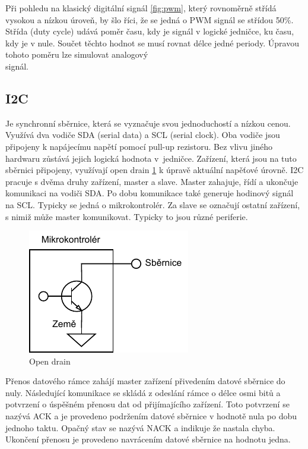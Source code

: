 \newpage
Při pohledu na klasický digitální signál \ref{fig:pwm}, který rovnoměrně střídá vysokou a nízkou úroveň, by šlo říci, že se jedná o PWM signál se střídou 50\%. Střída (duty cycle) udává poměr času, kdy je signál v logické jedničce, ku času, kdy je v nule. Součet těchto hodnot se musí rovnat délce jedné periody. Úpravou tohoto poměru lze simulovat analogový \\ signál.~\cite[str:~116-118]{embeded_robotics}

\subsection*{I2C}
Je synchronní sběrnice, která se vyznačuje svou jednoduchostí a nízkou cenou. Využívá dva vodiče SDA (serial data) a SCL (serial clock). Oba vodiče jsou připojeny k napájecímu napětí pomocí pull-up rezistoru. Bez vlivu jiného hardwaru zůstává jejich logická hodnota v~jedničce. Zařízení, která jsou na tuto sběrnici připojeny, využívají open drain \ref{fig:open_drain} k úpravě aktuální napěťové úrovně. I2C pracuje s dvěma druhy zařízení, master a slave. Master zahajuje, řídí a ukončuje komunikaci na vodiči SDA. Po dobu komunikace také generuje hodinový signál na SCL. Typicky se jedná o mikrokontrolér. Za slave se označují ostatní zařízení, s nimiž může master komunikovat. Typicky to jsou různé periferie. \cite[str:~88]{embeded_robotics}

\begin{figure}[h!]
	\centering
	\includegraphics[scale=1]{obrazky-figures/open_drain.pdf}
	\caption{Open drain}
	\label{fig:open_drain}
\end{figure}

Přenos datového rámce zahájí master zařízení přivedením datové sběrnice do nuly. Následující komunikace se skládá z odeslání rámce o délce osmi bitů a potvrzení o úspěšném přenosu dat od přijímajícího zařízení. Toto potvrzení se nazývá ACK a je provedeno podržením datové sběrnice v hodnotě nula po dobu jednoho taktu. Opačný stav se nazývá NACK a indikuje že nastala chyba. Ukončení přenosu je provedeno navrácením datové sběrnice na hodnotu jedna. \cite[str:~8-10]{um10204}

